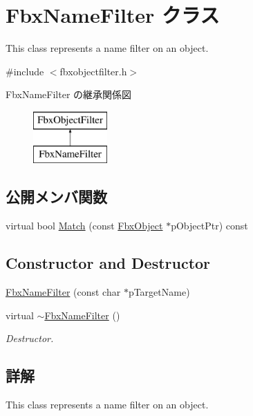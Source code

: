 \hypertarget{class_fbx_name_filter}{}\section{Fbx\+Name\+Filter クラス}
\label{class_fbx_name_filter}


This class represents a name filter on an object.  




{\ttfamily \#include $<$fbxobjectfilter.\+h$>$}

Fbx\+Name\+Filter の継承関係図\begin{figure}[H]
\begin{center}
\leavevmode
\includegraphics[height=2.000000cm]{class_fbx_name_filter}
\end{center}
\end{figure}
\subsection*{公開メンバ関数}
\begin{DoxyCompactItemize}
\item 
virtual bool \hyperlink{class_fbx_name_filter_a2767c75f626baed7800308f937302743}{Match} (const \hyperlink{class_fbx_object}{Fbx\+Object} $\ast$p\+Object\+Ptr) const
\end{DoxyCompactItemize}
\subsection*{Constructor and Destructor}
\begin{DoxyCompactItemize}
\item 
\hyperlink{class_fbx_name_filter_aa617f8a9e025839e93cf0fda0ec6cda4}{Fbx\+Name\+Filter} (const char $\ast$p\+Target\+Name)
\item 
virtual \hyperlink{class_fbx_name_filter_a44742170200731e2943525ccad88c48e}{$\sim$\+Fbx\+Name\+Filter} ()
\begin{DoxyCompactList}\small\item\em Destructor. \end{DoxyCompactList}\end{DoxyCompactItemize}


\subsection{詳解}
This class represents a name filter on an object. 

